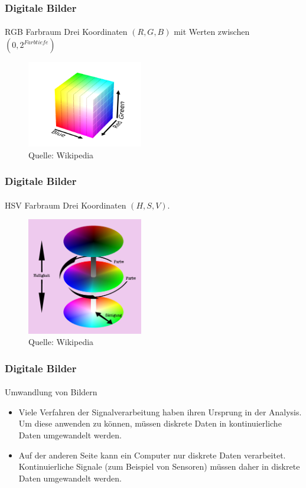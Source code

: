 \documentclass{beamer}
\begin{document}
\begin{frame}
    \frametitle{Digitale Bilder}
\framesubtitle{}
    \begin{block}{RGB Farbraum}
Drei Koordinaten $(R,G,B)$ mit Werten zwischen $(0, 2^{Farbtiefe})$
\end{block}
\begin{figure}[htp]
      \centering
    \includegraphics[width=0.45\textwidth]{img/RGB}
      \caption{Quelle: Wikipedia}
\end{figure}

 \end{frame}


\begin{frame}
    \frametitle{Digitale Bilder}
\framesubtitle{}
    \begin{block}{HSV Farbraum}
Drei Koordinaten $(H,S,V)$.
\end{block}
\begin{figure}[htp]
      \centering
    \includegraphics[width=0.45\textwidth]{img/HSV}
      \caption{Quelle: Wikipedia}
\end{figure}

 \end{frame}


\begin{frame}
    \frametitle{Digitale Bilder}
\framesubtitle{}
    \begin{block}{Umwandlung von Bildern}
\begin{itemize}
\item Viele Verfahren der  Signalverarbeitung haben ihren Ursprung in der Analysis. Um diese anwenden zu können, müssen diskrete Daten  in kontinuierliche Daten umgewandelt werden.
\item Auf der anderen Seite kann  ein Computer nur diskrete Daten  verarbeitet. Kontinuierliche Signale (zum Beispiel von Sensoren) müssen daher in diskrete Daten umgewandelt werden.
\end{itemize}
\end{block}

 \end{frame}
\end{document}
